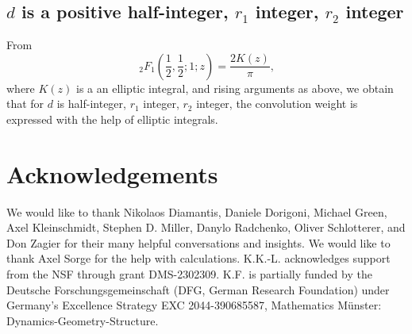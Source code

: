 \documentclass[]{article}
\begin{document}
\subsection{$d$ is a positive half-integer, $r_1$ integer, $r_2$ integer }
From \begin{equation}
    \, _2F_1\left(\frac{1}{2},\frac{1}{2};1;z\right) = \frac{2 K(z)}{\pi },
\end{equation}
where $K(z)$ is a an elliptic integral, 
and rising arguments as above, we obtain that for $d$ is half-integer, $r_1$ integer, $r_2$ integer, the convolution weight is expressed with the help of elliptic integrals.


\section*{Acknowledgements}
We would like to thank Nikolaos Diamantis, Daniele Dorigoni, Michael Green, Axel Kleinschmidt, Stephen D. Miller, Danylo Radchenko, Oliver Schlotterer, and Don Zagier for their many helpful conversations and insights. We would like to thank Axel Sorge for the help with calculations.   K.K.-L. acknowledges support from the NSF through grant DMS-2302309.  K.F. is partially funded by the Deutsche Forschungsgemeinschaft (DFG, German Research Foundation) under Germany's Excellence Strategy EXC 2044-390685587, Mathematics M\"unster: Dynamics-Geometry-Structure.



 
\end{document}
